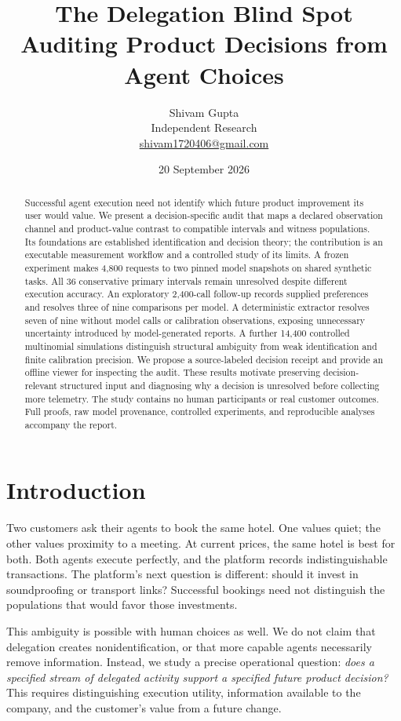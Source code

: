 \documentclass[10pt,twocolumn]{article}
\title{\vspace{-0.6cm}\textbf{The Delegation Blind Spot}\\[4pt]
\large Auditing Product Decisions from Agent Choices}
\author{Shivam Gupta\\Independent Research\\\small\href{mailto:shivam1720406@gmail.com}{shivam1720406@gmail.com}}
\date{20 September 2026}
\theoremstyle{definition}\newtheorem{definition}[theorem]{Definition}
\newcommand{\1}{\mathbf 1}
\begin{document}
\raggedbottom
\maketitle
\begin{abstract}
Successful agent execution need not identify which future product improvement its user would value. We present a decision-specific audit that maps a declared observation channel and product-value contrast to compatible intervals and witness populations. Its foundations are established identification and decision theory; the contribution is an executable measurement workflow and a controlled study of its limits. A frozen experiment makes 4,800 requests to two pinned model snapshots on shared synthetic tasks. All 36 conservative primary intervals remain unresolved despite different execution accuracy. An exploratory 2,400-call follow-up records supplied preferences and resolves three of nine comparisons per model. A deterministic extractor resolves seven of nine without model calls or calibration observations, exposing unnecessary uncertainty introduced by model-generated reports. A further 14,400 controlled multinomial simulations distinguish structural ambiguity from weak identification and finite calibration precision. We propose a source-labeled decision receipt and provide an offline viewer for inspecting the audit. These results motivate preserving decision-relevant structured input and diagnosing why a decision is unresolved before collecting more telemetry. The study contains no human participants or real customer outcomes. Full proofs, raw model provenance, controlled experiments, and reproducible analyses accompany the report.
\end{abstract}

\section{Introduction}
Two customers ask their agents to book the same hotel. One values quiet; the other values proximity to a meeting. At current prices, the same hotel is best for both. Both agents execute perfectly, and the platform records indistinguishable transactions. The platform's next question is different: should it invest in soundproofing or transport links? Successful bookings need not distinguish the populations that would favor those investments.

This ambiguity is possible with human choices as well. We do not claim that delegation creates nonidentification, or that more capable agents necessarily remove information. Instead, we study a precise operational question: \emph{does a specified stream of delegated activity support a specified future product decision?} This requires distinguishing execution utility, information available to the company, and the customer's value from a future change.
\end{document}

